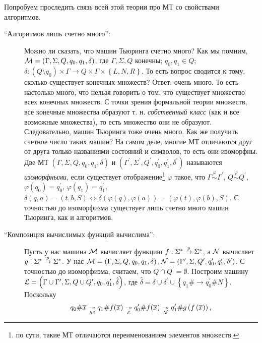 Попробуем проследить связь всей этой теории про МТ со свойствами алгоритмов.
\begin{description}
    \item[\enquote{Алгоритмов лишь счетно много}:] Можно ли сказать, что машин Тьюринга счетно много?
    Как мы помним, $\mathcal{M} = \left(\Gamma, \Sigma, Q, q_{0}, q_{1}, \delta\right)$, где $\Gamma, \Sigma, Q$ конечны; $q_{0}, q_{1} \in Q$; $\delta: \left(Q \setminus q_{0}\right)  \times \Gamma \to Q \times \Gamma \times \left\{L, N, R\right\}$.
    То есть вопрос сводится к тому, сколько существует конечных множеств?
    Ответ: очень много.
    То есть настолько много, что нельзя говорить о том, что существует множество всех конечных множеств.
    С точки зрения формальной теории множеств, все конечные множества образуют т. н. {\it собственный класс} (как и все возможные множества), то есть множество они не образуют.
    Следовательно, машин Тьюринга тоже очень много.
    Как же получить счетное число таких машин?
    На самом деле, многие МТ отличаются друг от  друга только названиями состояний и символов, то есть они изоморфны.
    Две МТ $\left(\Gamma, \Sigma, Q, q_{0}, q_{1}, \delta\right)$ и $\left(\Gamma^{\prime}, \Sigma^{\prime}, Q^{\prime}, q_{0}^{\prime}, q_{1}^{\prime}, \delta^{\prime}\right)$ называются {\it изоморфными}, если существует отображение\footnote{по сути, такие МТ отличаются переименованием элементов множеств.} $\varphi$ такое, что $\Gamma \overset{\varphi}{\sim} \Gamma^{\prime}$, $Q \overset{\varphi}{\sim} Q^{\prime}$, $\varphi\left(q_{0}\right) = q_{0}^{\prime}$, $\varphi\left(q_{1}\right) = q_{1}^{\prime}$, $\delta(q, a) = (t, b,  S) \iff \delta(\varphi(q), \varphi(a)) = (\varphi(t), \varphi(b), S)$.
    С точностью до изоморфизма существует лишь счетно много машин Тьюринга, как и алгоритмов.
    \item[\enquote{Композиция вычислимых функций вычислима}:] Пусть у нас машина $\mathcal{M}$ вычисляет функцию $f: \Sigma^{*} \overset{p}{\to} \Sigma^{*}$, а $\mathcal{N}$ вычисляет $g: \Sigma^{*} \overset{p}{\to} \Sigma^{*}$.
    У нас $\mathcal{M} = \left(\Gamma, \Sigma, Q, q_{0}, q_{1}, \delta\right), \mathcal{N} = \left(\Gamma^{\prime}, \Sigma, Q^{\prime}, q_{0}^{\prime}, q_{1}^{\prime}, \delta^{\prime}\right)$.
    С точностью до изоморфизма, считаем, что $Q \cap Q^{\prime} = \emptyset$.
    Построим машину $\mathcal{L} = \left(\Gamma \cup \Gamma^{\prime}, \Sigma, Q \cup Q^{\prime}, q_{0}, q_{1}^{\prime}, \hat{\delta}\right)$, где $\hat{\delta} = \delta \cup \delta^{\prime} \cup \left\{q_{1} \# \to q_{0}^{\prime} \# N\right\}$.
    Поскольку
    $$
        q_{0}\#\overline{x} \underset{\mathcal{M}}{\twoheadrightarrow} q_{1}\# f(\overline{x}) \underset{\mathcal{L}}{\twoheadrightarrow}  q_{0}^{\prime} \# f(\overline{x}) \underset{\mathcal{N}}{\twoheadrightarrow} q_{1}^{\prime} \# g\left(f\left(\overline{x}\right)\right),
$$
\end{description}
